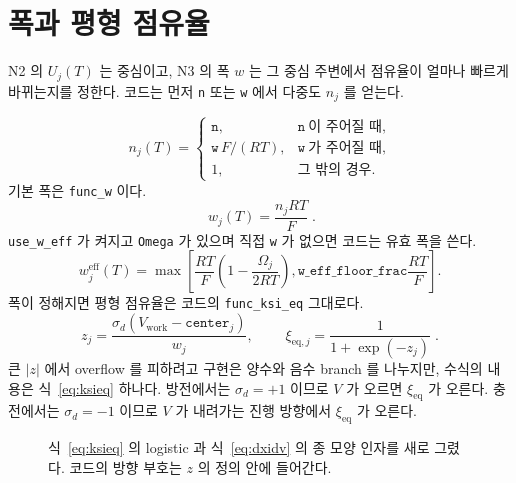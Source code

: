 \documentclass[11pt,a4paper]{article}
\newcommand{\eq}{\mathrm{eq}}
\newcommand{\eff}{\mathrm{eff}}
\newcommand{\work}{\mathrm{work}}
\begin{document}
\section{폭과 평형 점유율}\label{sec:n3}
N2 의 $U_j(T)$ 는 중심이고, N3 의 폭 $w$ 는 그 중심 주변에서 점유율이 얼마나 빠르게 바뀌는지를 정한다. 코드는 먼저 \texttt{n} 또는 \texttt{w} 에서 다중도 $n_j$ 를 얻는다.

\begin{equation}
n_j(T)=
\begin{cases}
\texttt{n},&\texttt{n}\ \text{이 주어질 때},\\
\texttt{w}\,F/(RT),&\texttt{w}\ \text{가 주어질 때},\\
1,&\text{그 밖의 경우}.
\end{cases}
\label{eq:nfactor}
\end{equation}
기본 폭은 \texttt{func\_w} 이다.
\begin{equation}
\boxed{\;w_j(T)=\frac{n_jRT}{F}\;.}
\label{eq:w}
\end{equation}
\texttt{use\_w\_eff} 가 켜지고 \texttt{Omega} 가 있으며 직접 \texttt{w} 가 없으면 코드는 유효 폭을 쓴다.
\begin{equation}
w_j^{\eff}(T)=
\max\!\left[
\frac{RT}{F}\left(1-\frac{\Omega_j}{2RT}\right),
\texttt{w\_eff\_floor\_frac}\frac{RT}{F}
\right].
\label{eq:weffcode}
\end{equation}
폭이 정해지면 평형 점유율은 코드의 \texttt{func\_ksi\_eq} 그대로다.
\begin{equation}
z_j=\frac{\sigma_d\left(V_{\work}-\texttt{center}_j\right)}{w_j},
\qquad
\boxed{\;\xi_{\eq,j}=\frac{1}{1+\exp(-z_j)}\;.}
\label{eq:ksieq}
\end{equation}
큰 $|z|$ 에서 overflow 를 피하려고 구현은 양수와 음수 branch 를 나누지만, 수식의 내용은 식~\eqref{eq:ksieq} 하나다. 방전에서는 $\sigma_d=+1$ 이므로 $V$ 가 오르면 $\xi_{\eq}$ 가 오른다. 충전에서는 $\sigma_d=-1$ 이므로 $V$ 가 내려가는 진행 방향에서 $\xi_{\eq}$ 가 오른다.

\begin{figure}[t]
\centering
{}
\caption{식~\eqref{eq:ksieq} 의 logistic 과 식~\eqref{eq:dxidv} 의 종 모양 인자를 새로 그렸다. 코드의 방향 부호는 $z$ 의 정의 안에 들어간다.}
\label{fig:logistic}
\end{figure}
\end{document}
